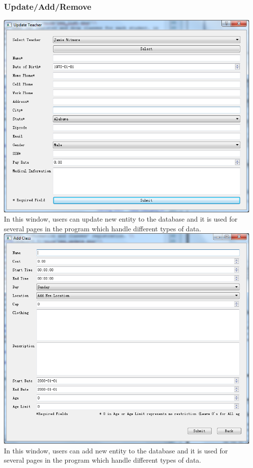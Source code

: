 \subsubsection{Update/Add/Remove}
\includegraphics[scale=0.5]{pics/update.png}\\
In this window, users can update new entity to the database and it is used for several pages in the program which handle different types of data.\\
\includegraphics[scale=0.5]{pics/add.png}\\
In this window, users can add new entity to the database and it is used for several pages in the program which handle different types of data.\\
